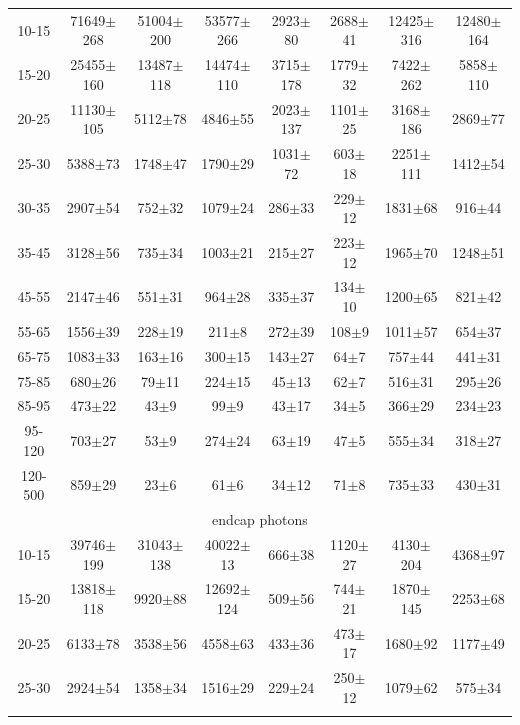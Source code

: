 \begin{table}[h]
\begin{center}
\begin{tabular}{|c|c|c|c|c|c|c|c|}
{\multicolumn{8}{|c|}{barrel photons}\\ \hline
10-15 & 71649$\pm$268 & 51004$\pm$200 & 53577$\pm$266 & 2923$\pm$80 & 2688$\pm$41 & 12425$\pm$316 & 12480$\pm$164 \\ \hline
15-20 & 25455$\pm$160 & 13487$\pm$118 & 14474$\pm$110 & 3715$\pm$178 & 1779$\pm$32 & 7422$\pm$262 & 5858$\pm$110 \\ \hline
20-25 & 11130$\pm$105 & 5112$\pm$78 & 4846$\pm$55 & 2023$\pm$137 & 1101$\pm$25 & 3168$\pm$186 & 2869$\pm$77 \\ \hline
25-30 & 5388$\pm$73 & 1748$\pm$47 & 1790$\pm$29 & 1031$\pm$72 & 603$\pm$18 & 2251$\pm$111 & 1412$\pm$54 \\ \hline
30-35 & 2907$\pm$54 & 752$\pm$32 & 1079$\pm$24 & 286$\pm$33 & 229$\pm$12 & 1831$\pm$68 & 916$\pm$44 \\ \hline
35-45 & 3128$\pm$56 & 735$\pm$34 & 1003$\pm$21 & 215$\pm$27 & 223$\pm$12 & 1965$\pm$70 & 1248$\pm$51 \\ \hline
45-55 & 2147$\pm$46 & 551$\pm$31 & 964$\pm$28 & 335$\pm$37 & 134$\pm$10 & 1200$\pm$65 & 821$\pm$42 \\ \hline
55-65 & 1556$\pm$39 & 228$\pm$19 & 211$\pm$8 & 272$\pm$39 & 108$\pm$9 & 1011$\pm$57 & 654$\pm$37 \\ \hline
65-75 & 1083$\pm$33 & 163$\pm$16 & 300$\pm$15 & 143$\pm$27 & 64$\pm$7 & 757$\pm$44 & 441$\pm$31 \\ \hline
75-85 & 680$\pm$26 & 79$\pm$11 & 224$\pm$15 & 45$\pm$13 & 62$\pm$7 & 516$\pm$31 & 295$\pm$26 \\ \hline
85-95 & 473$\pm$22 & 43$\pm$9 & 99$\pm$9 & 43$\pm$17 & 34$\pm$5 & 366$\pm$29 & 234$\pm$23 \\ \hline
95-120 & 703$\pm$27 & 53$\pm$9 & 274$\pm$24 & 63$\pm$19 & 47$\pm$5 & 555$\pm$34 & 318$\pm$27 \\ \hline
120-500 & 859$\pm$29 & 23$\pm$6 & 61$\pm$6 & 34$\pm$12 & 71$\pm$8 & 735$\pm$33 & 430$\pm$31 \\ \hline
\multicolumn{8}{|c|}{endcap photons}\\ \hline
10-15 & 39746$\pm$199 & 31043$\pm$138 & 40022$\pm$13 & 666$\pm$38 & 1120$\pm$27 & 4130$\pm$204 & 4368$\pm$97 \\ \hline
15-20 & 13818$\pm$118 & 9920$\pm$88 & 12692$\pm$124 & 509$\pm$56 & 744$\pm$21 & 1870$\pm$145 & 2253$\pm$68 \\ \hline
20-25 & 6133$\pm$78 & 3538$\pm$56 & 4558$\pm$63 & 433$\pm$36 & 473$\pm$17 & 1680$\pm$92 & 1177$\pm$49 \\ \hline
25-30 & 2924$\pm$54 & 1358$\pm$34 & 1516$\pm$29 & 229$\pm$24 & 250$\pm$12 & 1079$\pm$62 & 575$\pm$34 \\ \hline
}
\end{tabular}
\end{center}
\end{table}
